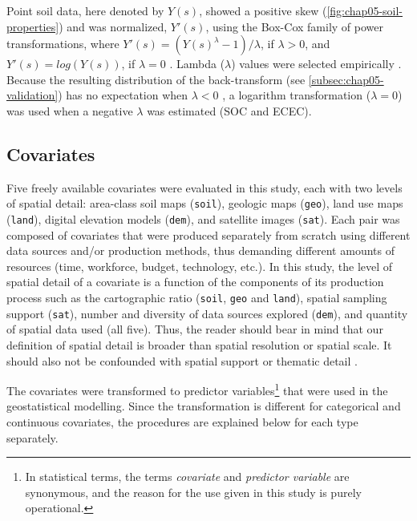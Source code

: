 Point soil data, here denoted by $Y(s)$, showed a positive skew (\autoref{fig:chap05-soil-properties}) and was 
normalized, $Y'(s)$, using the Box-Cox family of power transformations, where $Y'(s) = (Y(s)^{\lambda} - 1) / 
\lambda$, if $\lambda > 0$, and $Y'(s) = log(Y(s))$, if $\lambda = 0$ \cite{DiggleEtAl2007}. Lambda 
($\lambda$) values were selected empirically \cite{FoxEtAl2011}. Because the resulting distribution of the 
back-transform (see \autoref{subsec:chap05-validation}) has no expectation when $\lambda < 0$ 
\cite{RibeiroEtAl2001}, a logarithm transformation ($\lambda = 0$) was used when a negative $\lambda$ was 
estimated (SOC and ECEC).

\subsection{Covariates}
\label{subsec:chap05-sources}

Five freely available covariates were evaluated in this study, each with two levels of spatial detail: 
area-class soil maps (\texttt{soil}), geologic maps (\texttt{geo}), land use maps (\texttt{land}), digital 
elevation models (\texttt{dem}), and satellite images (\texttt{sat}). Each pair was composed of covariates 
that were produced separately from scratch using different data sources and/or production methods, thus 
demanding different amounts of resources (time, workforce, budget, technology, etc.). In this study, the level 
of spatial detail of a covariate is a function of the components of its production process such as the 
cartographic ratio (\texttt{soil}, \texttt{geo} and \texttt{land}), spatial sampling support (\texttt{sat}), 
number and diversity of data sources explored (\texttt{dem}), and quantity of spatial data used (all five). 
Thus, the reader should bear in mind that our definition of spatial detail is broader than spatial resolution 
or spatial scale. It should also not be confounded with spatial support \cite{WebsterEtAl2007} or thematic 
detail \cite{Rossiter2000}.

\def\footcovars{\footnote{In statistical terms, the terms \emph{covariate} and \emph{predictor variable} are 
synonymous, and the reason for the use given in this study is purely operational.}}

The covariates were transformed to predictor variables\footcovars{} that were used in the geostatistical 
modelling. Since the transformation is different for categorical and continuous covariates, the procedures are 
explained below for each type separately.

